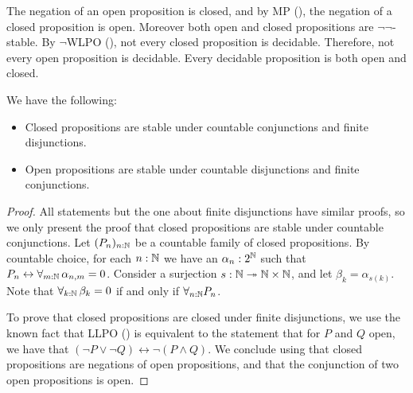 \begin{remark}\label{rmkOpenClosedNegation}
  The negation of an open proposition is closed, 
  and by MP (), the negation of a closed proposition is open. %
  Moreover both open and closed propositions are $\neg\neg$-stable. 
  By $\neg$WLPO (), 
  not every closed proposition is decidable. 
  Therefore, not every open proposition is decidable. 
  Every decidable proposition is both open and closed.
\end{remark}
\begin{lemma}
  We have the following:
  \begin{itemize}
    \item Closed propositions are stable under countable conjunctions and finite disjunctions. 
    \item Open propositions are stable under countable disjunctions and finite conjunctions. 
  \end{itemize}
\end{lemma}
\begin{proof}
  All statements but the one about finite disjunctions have similar proofs, so we only present the proof that closed propositions are stable under countable conjunctions. 
  Let $(P_n)_{n:\mathbb{N}}$ be a countable family of closed propositions. 
  By countable choice, for each 
  $n:\mathbb{N}$ we have an $\alpha_n:2^{\mathbb{N}}$ 
  such that $P_n \leftrightarrow \forall_{m:\mathbb{N}}\, \alpha_{n,m} =0$. 
  Consider a surjection $s:\mathbb{N} \twoheadrightarrow \mathbb{N} \times \mathbb{N}$, and let 
  $\beta_k = \alpha_{s(k)}.$
  Note that $\forall_{k:\mathbb{N}}\, \beta_k = 0$ if and only if 
  $\forall_{n:\mathbb{N}} P_n$. 

To prove that closed propositions are closed under finite disjunctions, we use the known fact that LLPO () is equivalent to the statement that for $P$ and $Q$ open, we have that $(\neg P \vee \neg Q) \leftrightarrow \neg (P\wedge Q)$. We conclude using that closed propositions are negations of open propositions, and that the conjunction of two open propositions is open.
\end{proof}

